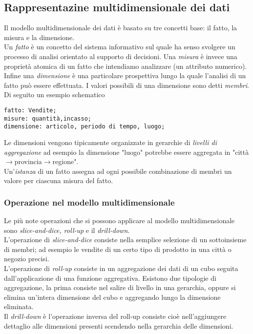 \subsection{Rappresentazine multidimensionale dei dati}
Il modello multidimensionale dei dati è basato su tre concetti base: il fatto, la misura e la dimensione.\\
Un \emph{fatto} è un concetto del sistema informativo sul quale ha senso svolgere un processo di analisi orientato al supporto di decisioni. Una \emph{misura} è invece una proprietà atomica di un fatto che intendiamo analizzare (un attributo numerico). Infine una \emph{dimensione} è una particolare prospettiva lungo la quale l'analisi di un fatto può essere effettuata. I valori possibili di una dimensione sono detti \emph{membri}.\\
Di seguito un esempio schematico
\begin{center}
\begin{verbatim}
fatto: Vendite;
misure: quantità,incasso;
dimensione: articolo, periodo di tempo, luogo;
\end{verbatim}
\end{center}

Le dimensioni vengono tipicamente organizzate in gerarchie di \emph{livelli di aggregazione} ad esempio la dimensione "luogo" potrebbe essere aggregata in "città$\rightarrow$provincia$\rightarrow$regione".\\
Un'\emph{istanza} di un fatto assegna ad ogni possibile combinazione di membri un valore per ciascuna misura del fatto.
\subsubsection{Operazione nel modello multidimensionale}
Le più note operazioni che si possono applicare al modello multidimensionale sono \emph{slice-and-dice, roll-up} e il \emph{drill-down}.\\
L'operazione di \emph{slice-and-dice} consiste nella semplice selezione di un sottoinsieme di membri; ad esempio le vendite di un certo tipo di prodotto in una città o negozio precisi.\\
L'operazione di \emph{roll-up} consiste in un aggregazione dei dati di un cubo seguita dall'applicazione di una funzione aggregativa. Esistono due tipologie di aggregazione, la prima consiste nel salire di livello in una gerarchia, oppure si elimina un'intera dimensione del cubo e aggregando lungo la dimensione eliminata.\\
Il \emph{drill-down} è l'operazione inversa del roll-up consiste cioè nell'aggiungere dettaglio alle dimensioni presenti scendendo nella gerarchia delle dimensioni.
